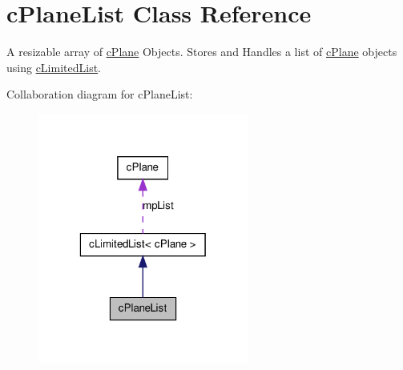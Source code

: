 \hypertarget{classc_plane_list}{
\section{cPlaneList Class Reference}
\label{classc_plane_list}
}


A resizable array of \hyperlink{classc_plane}{cPlane} Objects. Stores and Handles a list of \hyperlink{classc_plane}{cPlane} objects using \hyperlink{classc_limited_list}{cLimitedList}.  




Collaboration diagram for cPlaneList:\nopagebreak
\begin{figure}[H]
\begin{center}
\leavevmode
\includegraphics[width=196pt]{classc_plane_list__coll__graph}
\end{center}
\end{figure}
